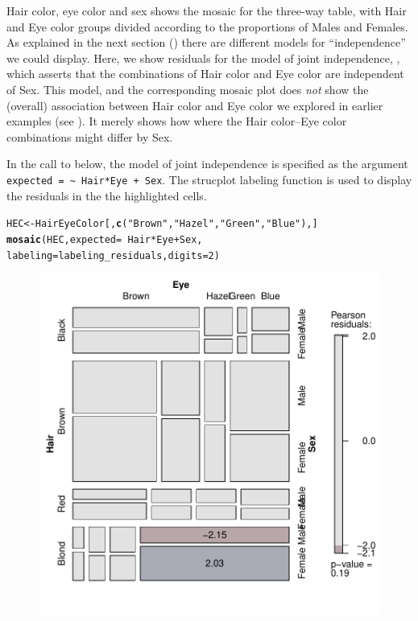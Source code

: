 \documentclass[11pt]{book}\usepackage[]{graphicx}\usepackage[]{color}
\makeatletter
\newcommand{\hlnum}[1]{\textcolor[rgb]{0.686,0.059,0.569}{#1}}%
\newcommand{\hlstr}[1]{\textcolor[rgb]{0.192,0.494,0.8}{#1}}%
\newcommand{\hlopt}[1]{\textcolor[rgb]{0,0,0}{#1}}%
\newcommand{\hlstd}[1]{\textcolor[rgb]{0.345,0.345,0.345}{#1}}%
\newcommand{\hlkwb}[1]{\textcolor[rgb]{0.69,0.353,0.396}{#1}}%
\newcommand{\hlkwc}[1]{\textcolor[rgb]{0.333,0.667,0.333}{#1}}%
\newcommand{\hlkwd}[1]{\textcolor[rgb]{0.737,0.353,0.396}{\textbf{#1}}}%
\newenvironment{kframe}{%
 \def\at@end@of@kframe{}%
 \ifinner\ifhmode%
  \def\at@end@of@kframe{\end{minipage}}%
  \begin{minipage}{\columnwidth}%
 \fi\fi%
 \def\FrameCommand##1{\hskip\@totalleftmargin \hskip-\fboxsep
 \colorbox{shadecolor}{##1}\hskip-\fboxsep
     \hskip-\linewidth \hskip-\@totalleftmargin \hskip\columnwidth}%
 \MakeFramed {\advance\hsize-\width
   \@totalleftmargin\z@ \linewidth\hsize
   \@setminipage}}%
 {\par\unskip\endMakeFramed%
 \at@end@of@kframe}
\newenvironment{knitrout}{}{} %
\renewenvironment{knitrout}{\small\renewcommand{\baselinestretch}{.85}}{} %
\makeatother
\begin{document}
\begin{Example}[HEC1]{Hair color, eye color and sex}
 shows the mosaic for the three-way table, with Hair and Eye color
groups divided according to the proportions of Males and Females.
As explained in the next section ()
there are different models for
``independence'' we could display.  Here, we show residuals for
the model of joint independence, , which 
asserts that the combinations of Hair color and Eye color are
independent of Sex.  This model, and the corresponding mosaic
plot does \emph{not} show the (overall) association between Hair color
and Eye color we explored in earlier examples (see ).  It merely shows how where the Hair color--Eye color
combinations might differ by Sex.

In the call to  below, the model of joint independence
is specified as the argument \verb|expected = ~ Hair*Eye + Sex|.
The strucplot labeling function 
is used to display the residuals in the the highlighted cells.
\begin{knitrout}
\color{fgcolor}\begin{kframe}
\begin{alltt}
\hlstd{HEC} \hlkwb{<-} \hlstd{HairEyeColor[,} \hlkwd{c}\hlstd{(}\hlstr{"Brown"}\hlstd{,} \hlstr{"Hazel"}\hlstd{,} \hlstr{"Green"}\hlstd{,} \hlstr{"Blue"}\hlstd{),]}
\hlkwd{mosaic}\hlstd{(HEC,} \hlkwc{expected} \hlstd{=} \hlopt{~} \hlstd{Hair}\hlopt{*}\hlstd{Eye} \hlopt{+} \hlstd{Sex,}
       \hlkwc{labeling}\hlstd{=labeling_residuals,} \hlkwc{digits}\hlstd{=}\hlnum{2}\hlstd{)}
\end{alltt}
\end{kframe}\begin{figure}[!htb]


\centerline{\includegraphics[width=.7\textwidth]{ch05/fig/HEC-mos1} }


\end{figure}
\end{knitrout}
\end{Example}
\end{document}

